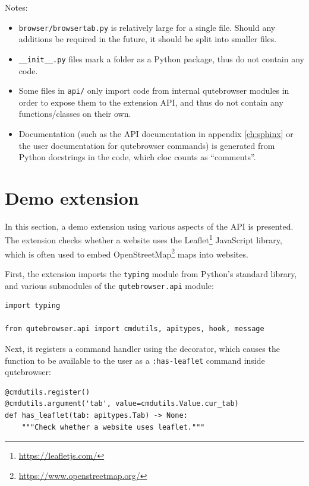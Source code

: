 Notes:

\begin{itemize}[parsep=5pt]

  \item \verb|browser/browsertab.py| is relatively large for a single file.
    Should any additions be required in the future, it should be split into smaller
    files.
  \item \verb|__init__.py| files mark a folder as a Python package, thus
    do not contain any code.
  \item Some files in \verb|api/| only import code from internal
    qutebrowser modules in order to expose them to the extension API, and thus
    do not contain any functions/classes on their own.
  \item Documentation (such as the API documentation in appendix \ref{ch:sphinx}
    or the user documentation for qutebrowser commands) is generated from
    Python docstrings in the code, which cloc counts as ``comments''.
\end{itemize}

\section{Demo extension}
In this section, a demo extension using various aspects of the API is
presented. The extension checks whether a website uses the
Leaflet\footnote{\url{https://leafletjs.com/}} JavaScript library, which is
often used to embed OpenStreetMap\footnote{\url{https://www.openstreetmap.org/}}
maps into websites.

First, the extension imports the \verb|typing| module from Python's standard
library, and various submodules of the \verb|qutebrowser.api| module:

\begin{verbatim}
import typing

from qutebrowser.api import cmdutils, apitypes, hook, message
\end{verbatim}

Next, it registers a command handler using the 
decorator, which causes the function to be available to the user as a
\verb|:has-leaflet| command inside qutebrowser:

\begin{verbatim}
@cmdutils.register()
@cmdutils.argument('tab', value=cmdutils.Value.cur_tab)
def has_leaflet(tab: apitypes.Tab) -> None:
    """Check whether a website uses leaflet."""
\end{verbatim}

